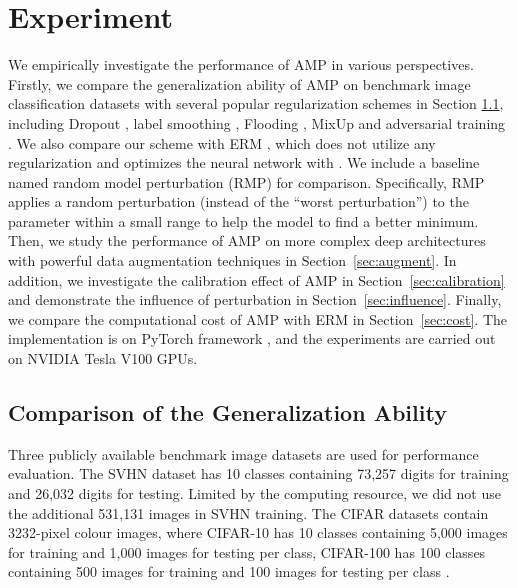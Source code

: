 \documentclass[final]{cvpr}
\begin{document}
\section{Experiment}

We empirically investigate the performance of AMP in various perspectives. Firstly, we compare the generalization ability of AMP on benchmark image classification datasets with several popular regularization schemes in Section \ref{sec:compare}, including Dropout \cite{srivastava2014dropout}, label smoothing \cite{szegedy2016rethinking}, Flooding \cite{ishida2020we}, MixUp \cite{zhang2018mixup} and adversarial training \cite{goodfellow2015explaining}. We also compare our scheme with ERM \cite{vapnik1998statistical}, which does not utilize any regularization and optimizes the neural network with . We include a baseline named random model perturbation (RMP) for comparison. Specifically, RMP applies a random perturbation (instead of the ``worst perturbation'') to the parameter within a small range to help the model to find a better minimum. Then, we study the performance of AMP on more complex deep architectures with powerful data augmentation techniques in Section~\ref{sec:augment}. In addition, we investigate the calibration effect of AMP in Section~\ref{sec:calibration} and demonstrate the influence of perturbation in Section~\ref{sec:influence}. Finally, we compare the computational cost of AMP with ERM in Section~\ref{sec:cost}. The implementation is on PyTorch framework \cite{paszke2019pytorch}, and the experiments are carried out on NVIDIA Tesla V100 GPUs.

\subsection{Comparison of the Generalization Ability}\label{sec:compare}

Three publicly available benchmark image datasets are used for performance evaluation. The SVHN dataset \cite{netzer2011reading} has 10 classes containing 73,257 digits for training and 26,032 digits for testing. Limited by the computing resource, we did not use the additional 531,131 images in SVHN training. The CIFAR datasets contain 3232-pixel colour images, where CIFAR-10 has 10 classes containing 5,000 images for training and 1,000 images for testing per class, CIFAR-100 has 100 classes containing 500 images for training and 100 images for testing per class \cite{krizhevsky2009learning}. 
\end{document}
